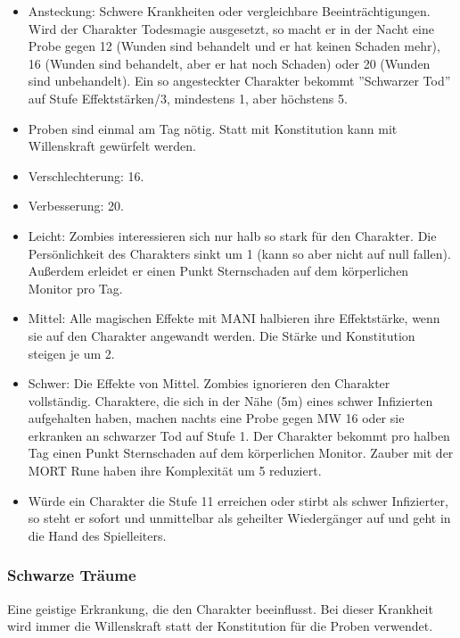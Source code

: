 \documentclass{article}
\begin{document}
\begin{itemize}
\item Ansteckung: Schwere Krankheiten oder vergleichbare Beeinträchtigungen. Wird der Charakter Todesmagie ausgesetzt, so macht er in der Nacht eine Probe gegen 12 (Wunden sind behandelt und er hat keinen Schaden mehr), 16 (Wunden sind behandelt, aber er hat noch Schaden) oder 20 (Wunden sind unbehandelt). Ein so angesteckter Charakter bekommt ''Schwarzer Tod'' auf Stufe Effektstärken/3, mindestens 1, aber höchstens 5.
\item Proben sind einmal am Tag nötig. Statt mit Konstitution kann mit Willenskraft gewürfelt werden.
\item Verschlechterung: 16.
\item Verbesserung: 20.
\item Leicht: Zombies interessieren sich nur halb so stark für den Charakter. Die Persönlichkeit des Charakters sinkt um 1 (kann so aber nicht auf null fallen). Außerdem erleidet er einen Punkt Sternschaden auf dem körperlichen Monitor pro Tag.
\item Mittel: Alle magischen Effekte mit MANI halbieren ihre Effektstärke, wenn sie auf den Charakter angewandt werden. Die Stärke und Konstitution steigen je um 2.
\item Schwer: Die Effekte von Mittel. Zombies ignorieren den Charakter vollständig. Charaktere, die sich in der Nähe (5m) eines schwer Infizierten aufgehalten haben, machen nachts eine Probe gegen MW 16 oder sie erkranken an schwarzer Tod auf Stufe 1. Der Charakter bekommt pro halben Tag einen Punkt Sternschaden auf dem körperlichen Monitor. Zauber mit der MORT Rune haben ihre Komplexität um 5 reduziert.
\item Würde ein Charakter die Stufe 11 erreichen oder stirbt als schwer Infizierter, so steht er sofort und unmittelbar als geheilter Wiedergänger auf und geht in die Hand des Spielleiters.
\end{itemize}

\subsubsection{Schwarze Träume}

Eine geistige Erkrankung, die den Charakter beeinflusst. Bei dieser Krankheit wird immer die Willenskraft statt der
Konstitution für die Proben verwendet.
\end{document}
